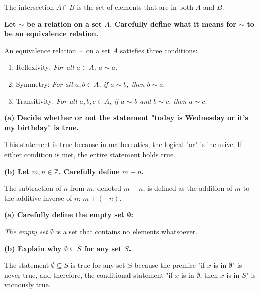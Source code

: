 The intersection \( A \cap B \) is the set of elements that are in both \( A \) and \( B \).


\textbf{Let \( \sim \) be a relation on a set \( A \). Carefully define what it means for \( \sim \) to be an equivalence relation.}

An equivalence relation \( \sim \) on a set \( A \) satisfies three conditions:
\begin{enumerate}
    \item Reflexivity: \textit{For all \( a \in A \), \( a \sim a \)}.
    \item Symmetry: \textit{For all \( a, b \in A \), if \( a \sim b \), then \( b \sim a \)}.
    \item Transitivity: \textit{For all \( a, b, c \in A \), if \( a \sim b \) and \( b \sim c \), then \( a \sim c \)}.
\end{enumerate}

\clearpage
{}

\textbf{(a) Decide whether or not the statement "today is Wednesday or it's my birthday" is true.}

This statement is true because in mathematics, the logical "or" is inclusive. If either condition is met, the entire statement holds true.

\textbf{(b) Let \( m, n \in \mathbb{Z} \). Carefully define \( m - n \).}

The subtraction of \( n \) from \( m \), denoted \( m - n \), is defined as the addition of \( m \) to the additive inverse of \( n \): \( m + (-n) \).


\textbf{(a) Carefully define the empty set \( \emptyset \):}

\textit{The empty set \( \emptyset \)} is a set that contains no elements whatsoever.

\textbf{(b) Explain why \( \emptyset \subseteq S \) for any set \( S \).}

The statement \( \emptyset \subseteq S \) is true for any set \( S \) because the premise "if \( x \) is in \( \emptyset \)" is never true, and therefore, the conditional statement "if \( x \) is in \( \emptyset \), then \( x \) is in \( S \)" is vacuously true.


